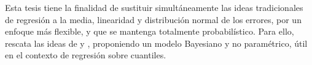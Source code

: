 Esta tesis tiene la finalidad de sustituir simult\'aneamente las ideas tradicionales de regresi\'on a la media, linearidad y distribuci\'on normal de los errores, por un enfoque m\'as flexible, y que se mantenga totalmente probabil\'istico. Para ello, rescata las ideas de \cite{Kottas_NotParamQuantReg} y \cite{Kottas_SemiparamQuantReg}, proponiendo un modelo Bayesiano y no param\'etrico, \'util en el contexto de regresi\'on sobre cuantiles.

\newpage
